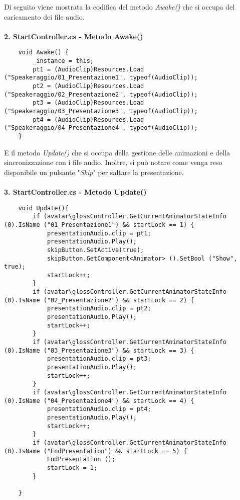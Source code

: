 Di seguito viene mostrata la codifica del metodo \textit{Awake()} che si occupa del caricamento dei file audio.
\\\\
\textbf{2. StartController.cs - Metodo Awake()}
\begin{lstlisting}
	void Awake() {
		_instance = this;
		pt1 = (AudioClip)Resources.Load ("Speakeraggio/01_Presentazione1", typeof(AudioClip));
		pt2 = (AudioClip)Resources.Load ("Speakeraggio/02_Presentazione2", typeof(AudioClip));
		pt3 = (AudioClip)Resources.Load ("Speakeraggio/03_Presentazione3", typeof(AudioClip));
		pt4 = (AudioClip)Resources.Load ("Speakeraggio/04_Presentazione4", typeof(AudioClip));
	}
\end{lstlisting}

E il metodo \textit{Update()} che si occupa della gestione delle animazioni e della sincronizzazione con i file audio. Inoltre, si pu\`o notare come venga reso disponibile un pulsante "\textit{Skip}" per saltare la presentazione.
\\\\
\textbf{3. StartController.cs - Metodo Update()}
\begin{lstlisting}
	void Update(){
		if (avatar\glossController.GetCurrentAnimatorStateInfo (0).IsName ("01_Presentazione1") && startLock == 1) {
			presentationAudio.clip = pt1;
			presentationAudio.Play();
			skipButton.SetActive(true);
			skipButton.GetComponent<Animator> ().SetBool ("Show", true);
			startLock++;
		}
		if (avatar\glossController.GetCurrentAnimatorStateInfo (0).IsName ("02_Presentazione2") && startLock == 2) {
			presentationAudio.clip = pt2;
			presentationAudio.Play();
			startLock++;
		}
		if (avatar\glossController.GetCurrentAnimatorStateInfo (0).IsName ("03_Presentazione3") && startLock == 3) {
			presentationAudio.clip = pt3;
			presentationAudio.Play();
			startLock++;
		}
		if (avatar\glossController.GetCurrentAnimatorStateInfo (0).IsName ("04_Presentazione4") && startLock == 4) {
			presentationAudio.clip = pt4;
			presentationAudio.Play();
			startLock++;
		}
		if (avatar\glossController.GetCurrentAnimatorStateInfo (0).IsName ("EndPresentation") && startLock == 5) {
			EndPresentation ();
			startLock = 1;
		}
	
	}
\end{lstlisting}

